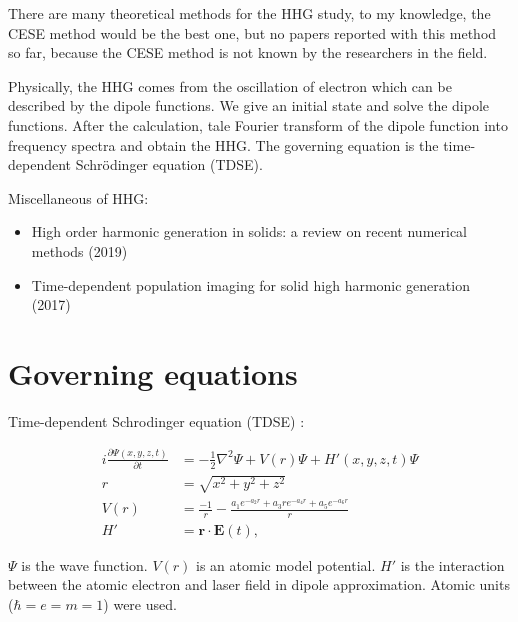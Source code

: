 \documentclass{isildur}
\begin{document}
There are many theoretical methods for the HHG study, to my knowledge, the CESE
method would be the best one, but no papers reported with this method so far,
because the CESE method is not known by the researchers in the field.

Physically, the HHG comes from the oscillation of electron which can be
described by the dipole functions. We give an initial state and solve the
dipole functions.  After the calculation, tale Fourier transform of the dipole
function into frequency spectra and obtain the HHG.  The governing equation is
the time-dependent Schrödinger equation (TDSE).

Miscellaneous of HHG:
%
\begin{itemize}

  \item High order harmonic generation in solids: a review on recent numerical
  methods (2019) \cite{yu_high_2019}

  \item Time-dependent population imaging for solid high harmonic generation
  (2017) \cite{liu_time-dependent_2017}

\end{itemize}

\chapter{Governing equations}
\label{c:goveq}

Time-dependent Schrodinger equation (TDSE) \cite{briggs_derivation_2007}:

\begin{align}
  i\frac{\partial \Psi(x, y, z, t)}{\partial t}
    &= -\frac{1}{2}\nabla^2\Psi + V(r)\Psi + H'(x, y, z, t)\Psi
    \label{e:tdse} \\
  r &= \sqrt{x^2+y^2+z^2} \nonumber \\
  V(r) &= \frac{-1}{r}
        - \frac{a_1e^{-a_2r}+a_3re^{-a_4r}+a_5e^{-a_6r}}{r} \\
  H' &= \mathbf{r}\cdot \mathbf{E}(t),
\end{align}

$\Psi$ is the wave function.  $V(r)$ is an atomic model potential.  $H'$ is the
interaction between the atomic electron and laser field in dipole
approximation.  Atomic units ($\hbar = e = m = 1$) were used.
\end{document}
